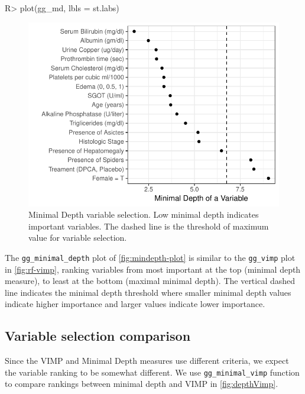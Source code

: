\documentclass[article, nojss]{jss}
\begin{document}
\begin{Schunk}
\begin{Sinput}
R> plot(gg_md, lbls = st.labs)
\end{Sinput}
\begin{figure}[!htb]

{\centering \includegraphics{rfs-mindepth-plot-1}

}

\caption[Minimal Depth variable selection]{Minimal Depth variable selection. Low minimal depth indicates important variables. The dashed line is the threshold of maximum value for variable selection.}\label{fig:mindepth-plot}
\end{figure}
\end{Schunk}

The \texttt{gg\_minimal\_depth} plot of \autoref{fig:mindepth-plot} is
similar to the \texttt{gg\_vimp} plot in \autoref{fig:rf-vimp}, ranking
variables from most important at the top (minimal depth measure), to
least at the bottom (maximal minimal depth). The vertical dashed line
indicates the minimal depth threshold where smaller minimal depth values
indicate higher importance and larger values indicate lower importance.

\subsection{Variable selection
comparison}\label{variable-selection-comparison}

Since the VIMP and Minimal Depth measures use different criteria, we
expect the variable ranking to be somewhat different. We use
\texttt{gg\_minimal\_vimp} function to compare rankings between minimal
depth and VIMP in \autoref{fig:depthVimp}.
\end{document}
